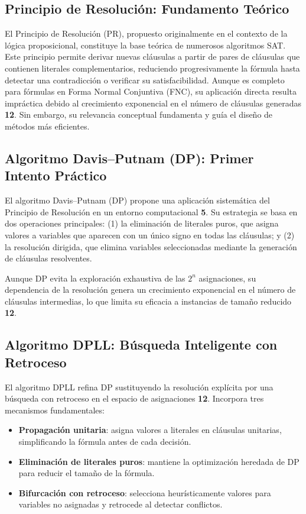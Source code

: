 \subsection{Principio de Resolución: Fundamento Teórico}
El Principio de Resolución (PR), propuesto originalmente en el contexto de la lógica proposicional, constituye la base teórica de numerosos algoritmos SAT. Este principio permite derivar nuevas cláusulas a partir de pares de cláusulas que contienen literales complementarios, reduciendo progresivamente la fórmula hasta detectar una contradicción o verificar su satisfacibilidad. Aunque es completo para fórmulas en Forma Normal Conjuntiva (FNC), su aplicación directa resulta impráctica debido al crecimiento exponencial en el número de cláusulas generadas \textbf{12}. Sin embargo, su relevancia conceptual fundamenta y guía el diseño de métodos más eficientes.

\subsection{Algoritmo Davis–Putnam (DP): Primer Intento Práctico}
El algoritmo Davis–Putnam (DP) propone una aplicación sistemática del Principio de Resolución en un entorno computacional \textbf{5}. Su estrategia se basa en dos operaciones principales: (1) la eliminación de literales puros, que asigna valores a variables que aparecen con un único signo en todas las cláusulas; y (2) la resolución dirigida, que elimina variables seleccionadas mediante la generación de cláusulas resolventes.  

Aunque DP evita la exploración exhaustiva de las $2^n$ asignaciones, su dependencia de la resolución genera un crecimiento exponencial en el número de cláusulas intermedias, lo que limita su eficacia a instancias de tamaño reducido \textbf{12}.

\subsection{Algoritmo DPLL: Búsqueda Inteligente con Retroceso}
El algoritmo DPLL refina DP sustituyendo la resolución explícita por una búsqueda con retroceso en el espacio de asignaciones \textbf{12}. Incorpora tres mecanismos fundamentales:
\begin{itemize}
  \item \textbf{Propagación unitaria}: asigna valores a literales en cláusulas unitarias, simplificando la fórmula antes de cada decisión.
  \item \textbf{Eliminación de literales puros}: mantiene la optimización heredada de DP para reducir el tamaño de la fórmula.
  \item \textbf{Bifurcación con retroceso}: selecciona heurísticamente valores para variables no asignadas y retrocede al detectar conflictos.
\end{itemize}

